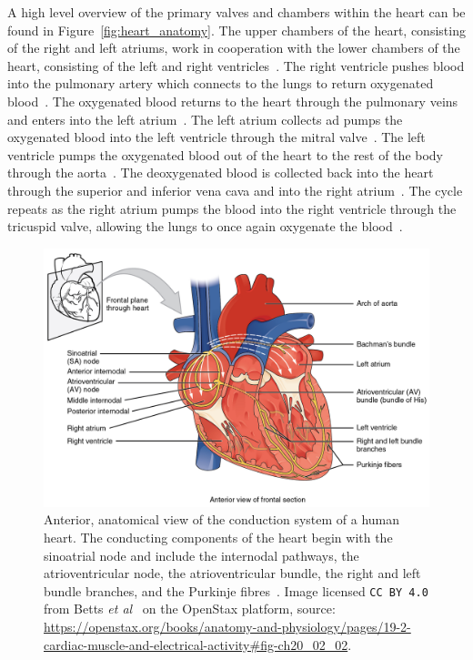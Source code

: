 \documentclass[\main/thesis.tex]{subfiles}
\begin{document}
A high level overview of the primary valves and chambers within the heart can be found in Figure~\ref{fig:heart_anatomy}.
The upper chambers of the heart, consisting of the right and left atriums, work in cooperation with the lower chambers of the heart, consisting of the left and right ventricles~\cite{anderson_wilcoxs_2013}.
The right ventricle pushes blood into the pulmonary artery which connects to the lungs to return oxygenated blood~\cite{anderson_wilcoxs_2013}.
The oxygenated blood returns to the heart through the pulmonary veins and enters into the left atrium~\cite{anderson_wilcoxs_2013}.
The left atrium collects ad pumps the oxygenated blood into the left ventricle through the mitral valve~\cite{anderson_wilcoxs_2013}.
The left ventricle pumps the oxygenated blood out of the heart to the rest of the body through the aorta~\cite{anderson_wilcoxs_2013}.
The deoxygenated blood is collected back into the heart through the superior and inferior vena cava and into the right atrium~\cite{anderson_wilcoxs_2013}.
The cycle repeats as the right atrium pumps the blood into the right ventricle through the tricuspid valve, allowing the lungs to once again oxygenate the blood~\cite{anderson_wilcoxs_2013}.

\begin{figure}[ht]
    \centering
    \includegraphics[width=14cm]{figure/conduction-system-of-the-heart.jpeg}
    \caption[Anterior, anatomical view of the conduction system of a human heart.]{Anterior, anatomical view of the conduction system of a human heart. The conducting components of the heart begin with the sinoatrial node and include the internodal pathways, the atrioventricular node, the atrioventricular bundle, the right and left bundle branches, and the Purkinje fibres~\cite{betts-anatomy-and-physiology}.
    Image licensed \texttt{CC BY 4.0} from Betts \emph{et al}~\cite{betts-anatomy-and-physiology} on the OpenStax platform, source: \url{https://openstax.org/books/anatomy-and-physiology/pages/19-2-cardiac-muscle-and-electrical-activity\#fig-ch20_02_02}.}
    \label{fig:heart_conduction_system}
\end{figure}
\end{document}
